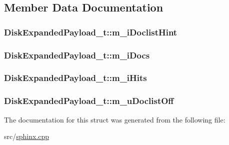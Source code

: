 \subsection{Member Data Documentation}
\hypertarget{structDiskExpandedPayload__t_a092c94197110128c4993176d7826a5fd}{
\subsubsection[{m\-\_\-i\-Doclist\-Hint}]{ Disk\-Expanded\-Payload\-\_\-t\-::m\-\_\-i\-Doclist\-Hint}}\label{structDiskExpandedPayload__t_a092c94197110128c4993176d7826a5fd}
\hypertarget{structDiskExpandedPayload__t_a0102dbbed9371fc53c23d850f9ae3957}{
\subsubsection[{m\-\_\-i\-Docs}]{ Disk\-Expanded\-Payload\-\_\-t\-::m\-\_\-i\-Docs}}\label{structDiskExpandedPayload__t_a0102dbbed9371fc53c23d850f9ae3957}
\hypertarget{structDiskExpandedPayload__t_a78a59a0901f9489a71e40d4588ed3517}{
\subsubsection[{m\-\_\-i\-Hits}]{ Disk\-Expanded\-Payload\-\_\-t\-::m\-\_\-i\-Hits}}\label{structDiskExpandedPayload__t_a78a59a0901f9489a71e40d4588ed3517}
\hypertarget{structDiskExpandedPayload__t_ad7ddcb299a75056788060f88894f281d}{
\subsubsection[{m\-\_\-u\-Doclist\-Off}]{ Disk\-Expanded\-Payload\-\_\-t\-::m\-\_\-u\-Doclist\-Off}}\label{structDiskExpandedPayload__t_ad7ddcb299a75056788060f88894f281d}


The documentation for this struct was generated from the following file\-:\begin{DoxyCompactItemize}
\item 
src/\hyperlink{sphinx_8cpp}{sphinx.\-cpp}\end{DoxyCompactItemize}
